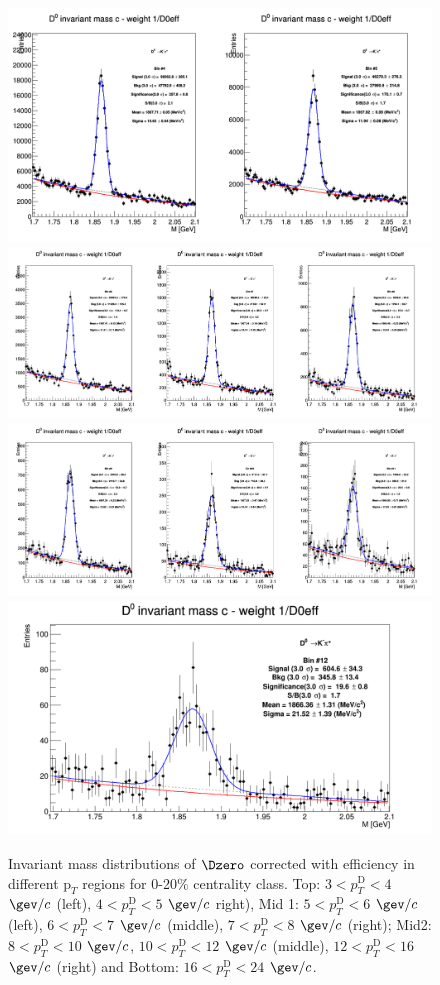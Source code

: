 \begin{figure}[!htp]
\centering
{\includegraphics[width=0.7\linewidth]{figuresVsCent/Dzero/MassPlots/020/InvMassDistributions_Dzero_Bins4to5.png}}
{\includegraphics[width=0.9\linewidth]{figuresVsCent/Dzero/MassPlots/020/InvMassDistributions_Dzero_Bins6to8.png}}
{\includegraphics[width=0.9\linewidth]{figuresVsCent/Dzero/MassPlots/020/InvMassDistributions_Dzero_Bins9to11.png}}
{\includegraphics[width=0.6\linewidth]{figuresVsCent/Dzero/MassPlots/020/InvMassDistributions_Dzero_Bins12to12.png}}
\caption{Invariant mass distributions of $\Dzero$ corrected with efficiency in different $\text{p}_T$ regions for 0-20$\%$ centrality class. Top: $3< p_{T}^{\text{D}}< 4$ $\gev/c$ (left), $4< p_{T}^{\text{D}}< 5$ $\gev/c$ right), Mid 1: $5< p_{T}^{\text{D}}< 6$ $\gev/c$ (left), $6 < p_{T}^{\text{D}} < 7$ $\gev/c$ (middle), $7< p_{T}^{\text{D}}< 8$ $\gev/c$ (right); Mid2: $8< p_{T}^{\text{D}}< 10$ $\gev/c$, $10< p_{T}^{\text{D}}< 12$ $\gev/c$  (middle), $12 < p_{T}^{\text{D}}< 16$ $\gev/c$  (right) and Bottom: $16<p_{T}^{\text{D}}< 24$ $\gev/c$.}
\label{fig:InvMassD0020}
\end{figure}

